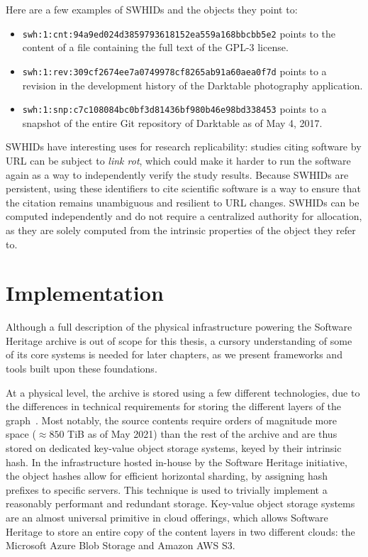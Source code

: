 Here are a few examples of \glspl{SWHID} and the objects they point to:

\begin{itemize}
    \setlength\itemsep{0em}
    \item \texttt{swh:1:cnt:94a9ed024d3859793618152ea559a168bbcbb5e2} points to
        the content of a file containing the full text of the GPL-3 license.
    \item \texttt{swh:1:rev:309cf2674ee7a0749978cf8265ab91a60aea0f7d} points to
        a revision in the development history of the Darktable photography
        application.
    \item \texttt{swh:1:snp:c7c108084bc0bf3d81436bf980b46e98bd338453} points to
        a snapshot of the entire Git repository of Darktable as of May 4, 2017.
\end{itemize}

\glspl{SWHID} have interesting uses for research replicability: studies
citing software by URL can be subject to \emph{link rot}, which could make it
harder to run the software again as a way to independently verify the study
results. Because \glspl{SWHID} are persistent, using these identifiers to cite
scientific software is a way to ensure that the citation remains unambiguous
and resilient to URL changes. \glspl{SWHID} can be computed independently and
do not require a centralized authority for allocation, as they are solely
computed from the intrinsic properties of the object they refer to.

\section{Implementation}%
\label{sec:swh-infrastructure}

Although a full description of the physical infrastructure powering the
Software Heritage archive is out of scope for this thesis, a cursory
understanding of some of its core systems is needed for later chapters, as we
present frameworks and tools built upon these foundations.

At a physical level, the archive is stored using a few different technologies,
due to the differences in technical requirements for storing the different
layers of the graph~\cite{swhipres2017}.
Most notably, the source contents require orders of magnitude more space
($\approx 850$ TiB as of May 2021) than the rest of the archive and are thus
stored on dedicated key-value object storage systems, keyed by their intrinsic
hash.  In the infrastructure hosted in-house by the Software Heritage
initiative, the object hashes allow for efficient horizontal sharding, by
assigning hash prefixes to specific servers. This technique is used to
trivially implement a reasonably performant and redundant storage.
Key-value object storage systems are an almost universal primitive in cloud
offerings, which allows Software Heritage to store an entire copy of the
content layers in two different clouds: the Microsoft Azure Blob Storage and
Amazon AWS S3.

